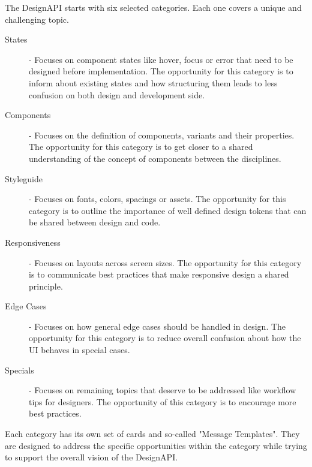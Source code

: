 %


The DesignAPI starts with six selected categories. Each one covers a unique and challenging topic.

\begin{description}
    \item[States] - Focuses on component states like hover, focus or error that need to be
          designed before implementation. The opportunity for this category is to inform about
          existing states and how structuring them leads to less confusion on both design and
          development side.

    \item[Components] - Focuses on the definition of components, variants and their properties.
          The opportunity for this category is to get closer to a shared understanding of the
          concept of components between the disciplines.

    \item[Styleguide] - Focuses on fonts, colors, spacings or assets. The opportunity for this
          category is to outline the importance of well defined design tokens that can be shared
          between design and code.

    \item[Responsiveness] - Focuses on layouts across screen sizes. The opportunity for this
          category is to communicate best practices that make responsive design a shared
          principle.

    \item[Edge Cases] - Focuses on how general edge cases should be handled in design. The
          opportunity for this category is to reduce overall confusion about how the UI behaves in
          special cases.

    \item[Specials] - Focuses on remaining topics that deserve to be addressed like workflow tips
          for designers. The opportunity of this category is to encourage more best practices.
\end{description}

Each category has its own set of cards and so-called "Message Templates". They are designed to
address the specific opportunities within the category while trying to support the overall vision of
the DesignAPI.

